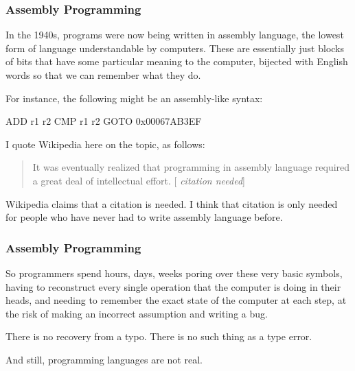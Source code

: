 \documentclass[aspectratio=169]{beamer}
\begin{document}
\begin{frame}[fragile]
  \frametitle{Assembly Programming}

  In the 1940s, programs were now being written in assembly language, the lowest
  form of language understandable by computers. These are essentially just blocks
  of bits that have some particular meaning to the computer, bijected with
  English words so that we can remember what they do.

  \vspace{\fill}

  For instance, the following might be an assembly-like syntax:
  \begin{codeblock}
    ADD r1 r2
    CMP r1 r2
    GOTO 0x00067AB3EF
  \end{codeblock}

  \vspace{\fill}

  I quote Wikipedia here on the topic, as follows:
  \begin{quote}
    It was eventually realized that programming in assembly language required a
    great deal of intellectual effort. [{\color{blue} \textit{citation needed}}]
  \end{quote}

  \vspace{\fill}

  Wikipedia claims that a citation is needed. I think that citation is only needed
  for people who have never had to write assembly language before.
\end{frame}

\begin{frame}[fragile]
  \frametitle{Assembly Programming}

  So programmers spend hours, days, weeks poring over these very basic symbols,
  having to reconstruct every single operation that the computer is doing in their
  heads, and needing to remember the exact state of the computer at each step,
  at the risk of making an incorrect assumption and writing a bug.

  \vspace{\fill}

  There is no recovery from a typo. There is no such thing as a type error.

  \vspace{\fill}

  And still, programming languages are not real.
\end{frame}
\end{document}
